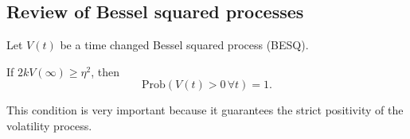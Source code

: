 \subsection{Review of Bessel squared processes}
Let $V(t)$ be a time changed Bessel squared process (BESQ).
\begin{proposition}
    If $2kV(\infty) \ge \eta^2$, then
    \begin{equation*}
        \text{Prob}(V(t)>0\,\forall t) = 1.
    \end{equation*}
\end{proposition}
This condition is very important because it guarantees the strict positivity of the volatility process.
